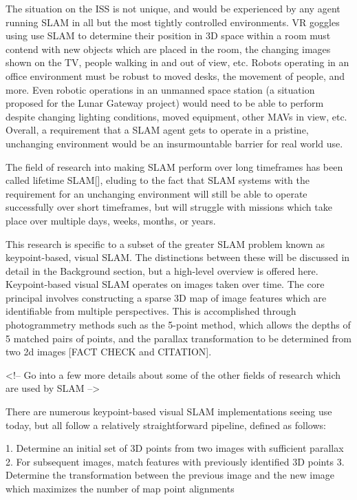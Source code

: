 The situation on the ISS is not unique, and would be experienced by any agent running SLAM in all but the most tightly controlled environments. VR goggles using use SLAM to determine their position in 3D space within a room must contend with new objects which are placed in the room, the changing images shown on the TV, people walking in and out of view, etc. Robots operating in an office environment must be robust to moved desks, the movement of people, and more. Even robotic operations in an unmanned space station (a situation proposed for the Lunar Gateway project) would need to be able to perform despite changing lighting conditions, moved equipment, other MAVs in view, etc. Overall, a requirement that a SLAM agent gets to operate in a pristine, unchanging environment would be an insurmountable barrier for real world use.

The field of research into making SLAM perform over long timeframes has been called lifetime SLAM[], eluding to the fact that SLAM systems with the requirement for an unchanging environment will still be able to operate successfully over short timeframes, but will struggle with missions which take place over multiple days, weeks, months, or years.

This research is specific to a subset of the greater SLAM problem known as keypoint-based, visual SLAM. The distinctions between these will be discussed in detail in the Background section, but a high-level overview is offered here. Keypoint-based visual SLAM operates on images taken over time. The core principal involves constructing a sparse 3D map of image features which are identifiable from multiple perspectives. This is accomplished through photogrammetry methods such as the 5-point method, which allows the depths of 5 matched pairs of points, and the parallax transformation to be determined from two 2d images [FACT CHECK and CITATION].

<!-- Go into a few more details about some of the other fields of research which are used by SLAM -->

There are numerous keypoint-based visual SLAM implementations seeing use today, but all follow a relatively straightforward pipeline, defined as follows:

1. Determine an initial set of 3D points from two images with sufficient parallax
2. For subsequent images, match features with previously identified 3D points
3. Determine the transformation between the previous image and the new image which maximizes the number of map point alignments

